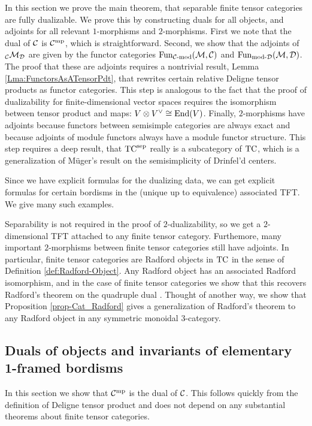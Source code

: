 \documentclass{amsart}
\begin{document}
In this section we prove the main theorem, that separable finite tensor categories are fully dualizable.  We prove this by constructing duals for all objects, and adjoints for all relevant $1$-morphisms and $2$-morphisms.  First we note that the dual of $\mathcal C$ is $\mathcal C^{\mathrm{mp}}$, which is straightforward.  Second, we show that the adjoints of ${}_\mathcal C \mathcal M_\mathcal D$ are given by the functor categories $\operatorname{Fun}_{{\mathcal C\text{-mod}}}(\mathcal M, \mathcal C)$ and $\operatorname{Fun}_{\text{mod-}\mathcal D}(\mathcal M, \mathcal D)$.  The proof that these are adjoints requires a nontrivial result, Lemma \ref{Lma:FunctorsAsATensorPdt}, that rewrites certain relative Deligne tensor products as functor categories.  This step is analogous to the fact that the proof of dualizability for finite-dimensional vector spaces requires the isomorphism between tensor product and maps: $V \otimes V^\vee \cong \operatorname{End}(V)$.  Finally, $2$-morphisms have adjoints because functors between semisimple categories are always exact and because adjoints of module functors always have a module functor structure.  This step requires a deep result, that ${\mathrm{TC}^{\text{sep}}}$ really is a subcategory of $\mathrm{TC}$, which is a generalization of M\"uger's result on the semisimplicity of Drinfel'd centers.

Since we have explicit formulas for the dualizing data, we can get explicit formulas for certain bordisms in the (unique up to equivalence) associated TFT.  We give many such examples.

Separability is not required in the proof of $2$-dualizability, so we get a $2$-dimensional TFT attached to any finite tensor category.  Furthemore, many important $2$-morphisms between finite tensor categories still have adjoints.  In particular, finite tensor categories are Radford objects in $\mathrm{TC}$ in the sense of Definition \ref{def:Radford-Object}.  Any Radford object has an associated Radford isomorphism, and in the case of finite tensor categories we show that this recovers Radford's theorem on the quadruple dual \cite{MR0407069, MR2097289}.  Thought of another way, we show that Proposition \ref{prop-Cat_Radford} gives a generalization of Radford's theorem to any Radford object in any symmetric monoidal $3$-category.

\subsection{Duals of objects and invariants of elementary 1-framed bordisms} \label{sec:df-objects}

In this section we show that $\mathcal C^{\mathrm{mp}}$ is the dual of $\mathcal C$.  This follows quickly from the definition of Deligne tensor product and does not depend on any substantial theorems about finite tensor categories.
\end{document}
